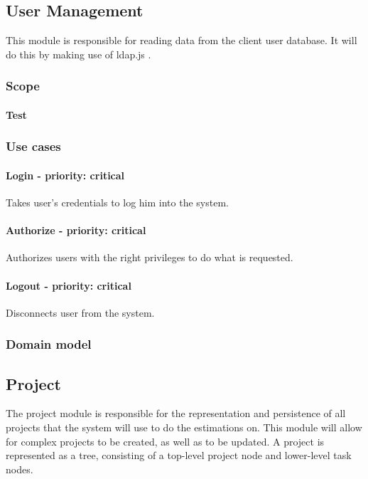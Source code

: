 \subsection{User Management}
This module is responsible for reading data from the client user database. It will do this by making use of ldap.js .
\subsubsection{Scope}
\paragraph{Test}
\subsubsection{Use cases}

\paragraph{Login - priority: critical}
Takes user's credentials to log him into the system.

\paragraph{Authorize - priority: critical}
Authorizes users with the right privileges to do what is requested.

\paragraph{Logout - priority: critical}
Disconnects user from the system.

\subsubsection{Domain model}

\subsection{Project}
The project module is responsible for the representation and persistence of all projects that the system will use to do the estimations on. This module will allow for complex projects to be created, as well as to be updated. A project is represented as a tree, consisting of a top-level project node and lower-level task nodes.

